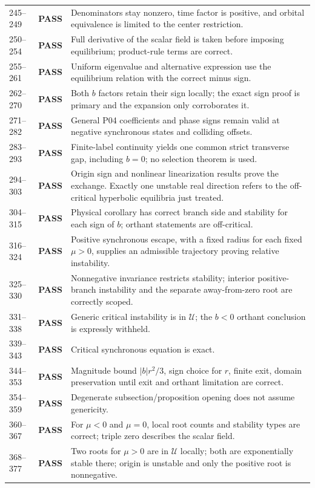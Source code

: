 \documentclass[11pt]{article}
\newcommand{\U}{\mathcal U}
\newcommand{\pass}{\textbf{PASS}}
\begin{document}
\begin{longtable}{@{}p{}p{}p{}@{}}
245--249 & \pass & Denominators stay nonzero, time factor is positive, and orbital equivalence is limited to the center restriction.\\
250--254 & \pass & Full derivative of the scalar field is taken before imposing equilibrium; product-rule terms are correct.\\
255--261 & \pass & Uniform eigenvalue and alternative expression use the equilibrium relation with the correct minus sign.\\
262--270 & \pass & Both $b$ factors retain their sign locally; the exact sign proof is primary and the expansion only corroborates it.\\
271--282 & \pass & General P04 coefficients and phase signs remain valid at negative synchronous states and colliding offsets.\\
283--293 & \pass & Finite-label continuity yields one common strict transverse gap, including $b=0$; no selection theorem is used.\\
294--303 & \pass & Origin sign and nonlinear linearization results prove the exchange. Exactly one unstable real direction refers to the off-critical hyperbolic equilibria just treated.\\
304--315 & \pass & Physical corollary has correct branch side and stability for each sign of $b$; orthant statements are off-critical.\\
316--324 & \pass & Positive synchronous escape, with a fixed radius for each fixed $\mu>0$, supplies an admissible trajectory proving relative instability.\\
325--330 & \pass & Nonnegative invariance restricts stability; interior positive-branch instability and the separate away-from-zero root are correctly scoped.\\
331--338 & \pass & Generic critical instability is in $\U$; the $b<0$ orthant conclusion is expressly withheld.\\
339--343 & \pass & Critical synchronous equation is exact.\\
344--353 & \pass & Magnitude bound $|b|r^2/3$, sign choice for $r$, finite exit, domain preservation until exit and orthant limitation are correct.\\
354--359 & \pass & Degenerate subsection/proposition opening does not assume genericity.\\
360--367 & \pass & For $\mu<0$ and $\mu=0$, local root counts and stability types are correct; triple zero describes the scalar field.\\
368--377 & \pass & Two roots for $\mu>0$ are in $\U$ locally; both are exponentially stable there; origin is unstable and only the positive root is nonnegative.\\

\end{longtable}
\end{document}
